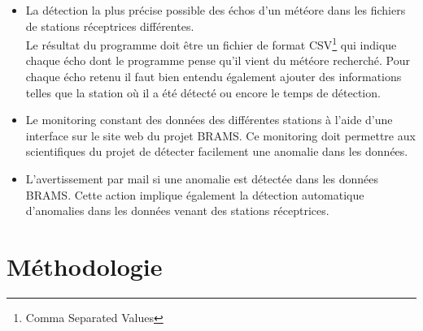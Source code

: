 \documentclass[11pt]{article}
\begin{document}
\begin{itemize}
    \item La détection la plus précise possible des échos d'un météore dans les fichiers de stations réceptrices différentes.\\
          Le résultat du programme doit être un fichier de format CSV\footnote{Comma Separated Values} qui indique chaque écho dont le programme pense qu'il vient du météore recherché.
          Pour chaque écho retenu il faut bien entendu également ajouter des informations telles que la station où il a été détecté ou encore le temps de détection.
    \item Le monitoring constant des données des différentes stations à l'aide d'une interface sur le site web du projet BRAMS.
          Ce monitoring doit permettre aux scientifiques du projet de détecter facilement une anomalie dans les données.
    \item L'avertissement par mail si une anomalie est détectée dans les données BRAMS.
          Cette action implique également la détection automatique d'anomalies dans les données venant des stations réceptrices.
\end{itemize}

\newpage

\section{Méthodologie}
\end{document}
